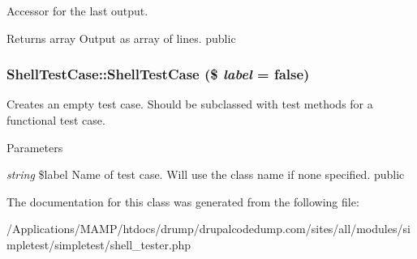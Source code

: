 \label{class_shell_test_case_a53847d86f26b9ffc12f030041628bcd9}
Accessor for the last output. \begin{DoxyReturn}{Returns}
array Output as array of lines.  public 
\end{DoxyReturn}
\hypertarget{class_shell_test_case_a9c5fa9fa230ab68848e100848c9cf24a}{
\subsubsection[{ShellTestCase}]{\setlength{\rightskip}{0pt plus 5cm}ShellTestCase::ShellTestCase (\$ {\em label} = {\ttfamily false})}}
\label{class_shell_test_case_a9c5fa9fa230ab68848e100848c9cf24a}
Creates an empty test case. Should be subclassed with test methods for a functional test case. 
\begin{DoxyParams}{Parameters}
\item[{\em string}]\$label Name of test case. Will use the class name if none specified.  public \end{DoxyParams}


The documentation for this class was generated from the following file:\begin{DoxyCompactItemize}
\item 
/Applications/MAMP/htdocs/drump/drupalcodedump.com/sites/all/modules/simpletest/simpletest/shell\_\-tester.php\end{DoxyCompactItemize}
